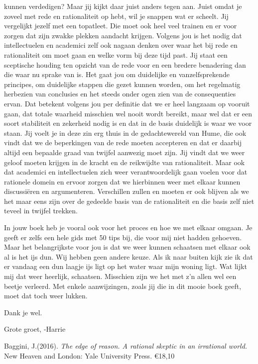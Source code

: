 \documentclass[]{book}
\begin{document}
kunnen verdedigen? Maar jij kijkt daar juist anders tegen aan. Juist
omdat je zoveel met rede en rationaliteit op hebt, wil je snappen wat er
scheelt. Jij vergelijkt jezelf met een topatleet. Die moet ook heel veel
trainen en er voor zorgen dat zijn zwakke plekken aandacht krijgen.
Volgens jou is het nodig dat intellectuelen en academici zelf ook nagaan
denken over waar het bij rede en rationaliteit om moet gaan en welke
vorm bij deze tijd past. Jij staat een sceptische houding ten opzicht
van de rede voor en een bredere benadering dan die waar nu sprake van
is. Het gaat jou om duidelijke en vanzelfsprekende principes, om
duidelijke stappen die gezet kunnen worden, om het regelmatig herbezien
van conclusies en het steeds onder ogen zien van de consequenties ervan.
Dat betekent volgens jou per definitie dat we er heel langzaam op
vooruit gaan, dat totale waarheid misschien wel nooit wordt bereikt,
maar wel dat er een soort stabiliteit en zekerheid nodig is en dat in de
basis duidelijk is waar we voor staan. Jij voelt je in deze zin erg
thuis in de gedachtewereld van Hume, die ook vindt dat we de beperkingen
van de rede moeten accepteren en dat er daarbij altijd een bepaalde
graad van twijfel aanwezig moet zijn. Jij vindt dat we weer geloof
moeten krijgen in de kracht en de reikwijdte van rationaliteit. Maar ook
dat academici en intellectuelen zich weer verantwoordelijk gaan voelen
voor dat rationele domein en ervoor zorgen dat we hierbinnen weer met
elkaar kunnen discussiëren en argumenteren. Verschillen zullen en moeten
er ook blijven als we het maar eens zijn over de gedeelde basis van de
rationaliteit en die basis zelf niet teveel in twijfel trekken.

In jouw boek heb je vooral ook voor het proces en hoe we met elkaar
omgaan. Je geeft er zelfs een hele gids met 50 tips bij, die voor mij
niet hadden gehoeven. Maar het belangrijkste voor jou is dat we weer
kunnen schaatsen met elkaar ook al is het ijs dun. Wij hebben geen
andere keuze. Als ik naar buiten kijk zie ik dat er vandaag een dun
laagje ijs ligt op het water waar mijn woning ligt. Wat lijkt mij dat
weer heerlijk, schaatsen. Misschien zijn we het met z'n allen wel een
beetje verleerd. Met enkele aanwijzingen, zoals jij die in dit mooie
boek geeft, moet dat toch weer lukken.

Dank je wel.

Grote groet, -Harrie

Baggini, J.(2016). \emph{The edge of reason. A rational skeptic in an
irrational world.} New Heaven and London: Yale University Press. €18,10
\end{document}
